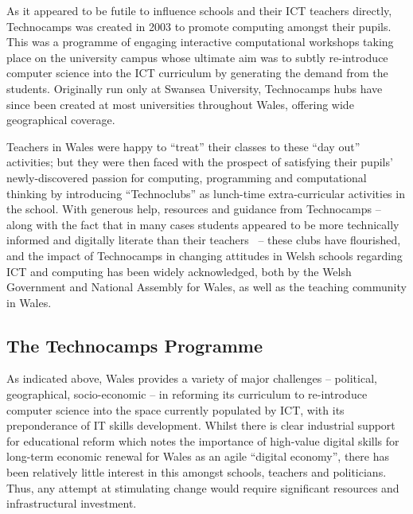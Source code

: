 \documentclass{sig-alternate}
\begin{document}
As it appeared to be futile to influence schools and their ICT
teachers directly, Technocamps was created in 2003 to promote
computing amongst their pupils.  This was a programme of engaging
interactive computational workshops taking place on the university
campus whose ultimate aim was to subtly re-introduce computer science
into the ICT curriculum by generating the demand from the students.
Originally run only at Swansea University, Technocamps hubs have since
been created at most universities throughout Wales, offering wide
geographical coverage.

Teachers in Wales were happy to ``treat'' their classes to these ``day
out'' activities; but they were then faced with the prospect of
satisfying their pupils' newly-discovered passion for computing,
programming and computational thinking by introducing ``Technoclubs''
as lunch-time extra-curricular activities in the school.  With
generous help, resources and guidance from Technocamps -- along with
the fact that in many cases students appeared to be more technically
informed and digitally literate than their
teachers~\cite{sentance-et-al-wipsce2012} -- these clubs have
flourished, and the impact of Technocamps in changing attitudes in
Welsh schools regarding ICT and computing has been widely
acknowledged, both by the Welsh Government and National Assembly for
Wales, as well as the teaching community in Wales.

\subsection{The Technocamps Programme}\label{technoprogramme}

As indicated above, Wales provides a variety of major challenges --
political, geographical, socio-economic -- in reforming its curriculum
to re-introduce computer science into the space currently populated by
ICT, with its preponderance of IT skills development.  Whilst there is
clear industrial support for educational reform which notes the
importance of high-value digital skills for long-term economic renewal
for Wales as an agile ``digital economy'', there has been relatively
little interest in this amongst schools, teachers and politicians.
Thus, any attempt at stimulating change would require significant
resources and infrastructural investment.
\end{document}

